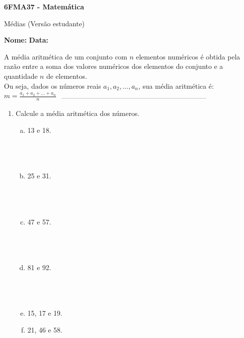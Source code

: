 \documentclass[a4paper,14pt]{article}
\begin{document}
	
	\noindent\textbf{6FMA37 - Matemática} 
	
	\begin{center}Médias (Versão estudante)
	\end{center}
	
	\noindent\textbf{Nome:} \underline{\hspace{10cm}}
	\noindent\textbf{Data:} \underline{\hspace{4cm}}
	
    \begin{multicols}{2}
    	\noindent A média aritmética de um conjunto com $n$ elementos numéricos é obtida pela razão entre a soma dos valores numéricos dos elementos do conjunto e a quantidade $n$ de elementos. \\
    	Ou seja, dados os números reais $a_1, a_2, ..., a_n$, sua média aritmética é:
    	$m = \frac{a_1 + a_2 + ... + a_n}{n}$
    	\noindent\textsubscript{~---------------------------------------------------------------------------}
    	\begin{enumerate}
			\item Calcule a média aritmética dos números.
			\begin{enumerate}[a)]
				\item 13 e 18. \\\\\\\\
				\item 25 e 31. \\\\\\\\
				\item 47 e 57. \\\\\\\\
				\item 81 e 92. \\\\\\\\
				\item 15, 17 e 19. \\
				\item 21, 46 e 58. \\\\\\\\

\end{enumerate}
\end{enumerate}
\end{multicols}
\end{document}
